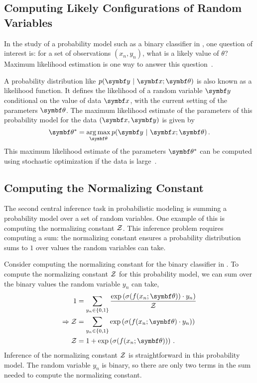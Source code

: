 \subsection{Computing Likely Configurations of Random Variables}
In the study of a probability model such as a binary classifier in , one question of interest is: for a set of observations $(x_n, y_n)$, what is a likely value of $\theta$? Maximum likelihood estimation is one way to answer this question~\citep{bishop2006pattern}.

A probability distribution like $p(\mby \mid \mbx; \mbtheta)$ is also known as a likelihood function. It defines the likelihood of a random variable $\mby$ conditional on the value of data $\mbx$, with the current setting of the parameters $\mbtheta$. The maximum likelihood estimate of the parameters of this probability model for the data $(\mbx, \mby)$ is given by
\begin{equation}
  \mbtheta^* = \argmax_{\mbtheta} p(\mby \mid \mbx; \mbtheta)\, .
\end{equation}
This maximum likelihood estimate of the parameters $\mbtheta^*$ can be computed using stochastic optimization if the data is large~\citep{robbins1951a-stochastic}. %

\subsection{Computing the Normalizing Constant}

The second central inference task in probabilistic modeling is summing a probability model over a set of random variables. One example of this is computing the normalizing constant $\mathcal{Z}$. This inference problem requires computing a sum: the normalizing constant ensures a probability distribution sums to $1$ over values the random variables can take.

Consider computing the normalizing constant for the binary classifier in .  To compute the normalizing constant $\mathcal{Z}$ for this probability model, we can sum over the binary values the random variable $y_n$ can take,
\begin{align}
1 &= \sum_{y_n \in \{0, 1\}} \frac{\exp\left( \sigma(f(x_n; \mbtheta)) \cdot y_n\right)}{\cZ} \\
\Rightarrow \cZ &= \sum_{y_n \in \{0, 1\}} \exp\left( \sigma(f(x_n; \mbtheta) \cdot y_n)\right)\\
\cZ &= 1 + \exp\left( \sigma(f(x_n; \mbtheta))\right)\, .
\end{align}
Inference of the normalizing constant $\mathcal{Z}$ is straightforward in this probability model. The random variable $y_n$ is binary, so there are only two terms in the sum needed to compute the normalizing constant.

